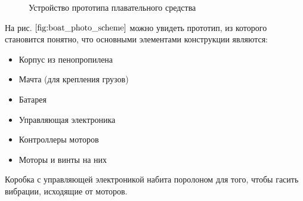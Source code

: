 \documentclass[12pt,a4paper]{article}
\begin{document}


\begin{figure}[h!]
	\caption{Устройство прототипа плавательного средства}
	\label{fig:boat_photo_scheme}
\end{figure}

На рис. $\ref{fig:boat_photo_scheme}$ можно увидеть прототип, из которого становится понятно, что основными элементами конструкции являются:
\begin{itemize}
	\item Корпус из пенопропилена
	\item Мачта (для крепления грузов)
	\item Батарея
	\item Управляющая электроника
	\item Контроллеры моторов
	\item Моторы и винты на них
\end{itemize}

Коробка с управляющей электроникой набита поролоном для того, чтобы гасить вибрации, исходящие от моторов.






\end{document}
